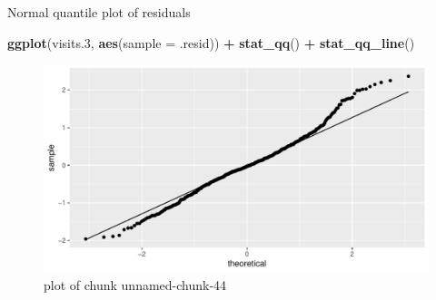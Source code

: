 \documentclass[ignorenonframetext,]{beamer}
\newenvironment{Shaded}{\begin{snugshade}}{\end{snugshade}}
\newcommand{\DataTypeTok}[1]{\textcolor[rgb]{0.13,0.29,0.53}{#1}}
\newcommand{\FloatTok}[1]{\textcolor[rgb]{0.00,0.00,0.81}{#1}}
\newcommand{\KeywordTok}[1]{\textcolor[rgb]{0.13,0.29,0.53}{\textbf{#1}}}
\newcommand{\NormalTok}[1]{#1}
\newcommand{\OperatorTok}[1]{\textcolor[rgb]{0.81,0.36,0.00}{\textbf{#1}}}
\newcommand{\StringTok}[1]{\textcolor[rgb]{0.31,0.60,0.02}{#1}}
\begin{document}
\begin{frame}[fragile]{Normal quantile plot of residuals}
\protect\hypertarget{normal-quantile-plot-of-residuals-1}{}

\begin{Shaded}
\begin{Highlighting}[]
\KeywordTok{ggplot}\NormalTok{(visits}\FloatTok{.3}\NormalTok{, }\KeywordTok{aes}\NormalTok{(}\DataTypeTok{sample =}\NormalTok{ .resid)) }\OperatorTok{+}\StringTok{ }\KeywordTok{stat_qq}\NormalTok{() }\OperatorTok{+}\StringTok{ }\KeywordTok{stat_qq_line}\NormalTok{()}
\end{Highlighting}
\end{Shaded}

\begin{figure}
\centering
\includegraphics{figure/unnamed-chunk-44-1.pdf}
\caption{plot of chunk unnamed-chunk-44}
\end{figure}

\end{frame}
\end{document}
